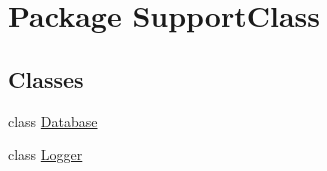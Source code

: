 \hypertarget{namespace_support_class}{}\section{Package Support\+Class}
\label{namespace_support_class}
\subsection*{Classes}
\begin{DoxyCompactItemize}
\item 
class \hyperlink{class_support_class_1_1_database}{Database}
\item 
class \hyperlink{class_support_class_1_1_logger}{Logger}
\end{DoxyCompactItemize}
